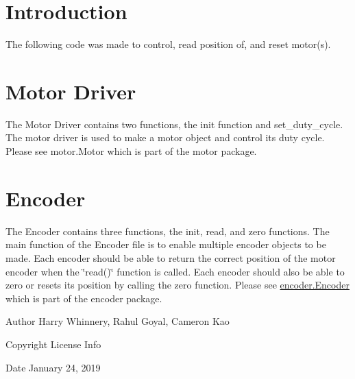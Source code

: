 \hypertarget{index_sec_intro}{}\section{Introduction}\label{index_sec_intro}
The following code was made to control, read position of, and reset motor(s).\hypertarget{index_sec_mot}{}\section{Motor Driver}\label{index_sec_mot}
The Motor Driver contains two functions, the init function and set\+\_\+duty\+\_\+cycle. The motor driver is used to make a motor object and control its duty cycle. Please see motor.\+Motor which is part of the motor package.\hypertarget{index_sec_enc}{}\section{Encoder}\label{index_sec_enc}
The Encoder contains three functions, the init, read, and zero functions. The main function of the Encoder file is to enable multiple encoder objects to be made. Each encoder should be able to return the correct position of the motor encoder when the \char`\"{}read()\char`\"{} function is called. Each encoder should also be able to zero or resets it\textquotesingle{}s position by calling the zero function. Please see \mbox{\hyperlink{classencoder_1_1_encoder}{encoder.\+Encoder}} which is part of the encoder package.

\begin{DoxyAuthor}{Author}
Harry Whinnery, Rahul Goyal, Cameron Kao
\end{DoxyAuthor}
\begin{DoxyCopyright}{Copyright}
License Info
\end{DoxyCopyright}
\begin{DoxyDate}{Date}
January 24, 2019 
\end{DoxyDate}
